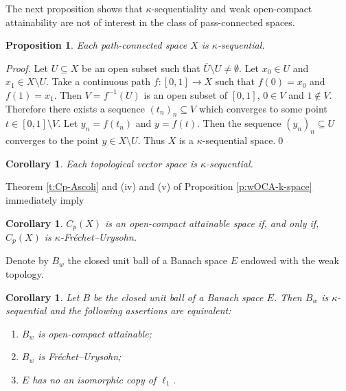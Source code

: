 \documentclass[preprint,11pt]{elsarticle}
\newtheorem{corollary}[theorem]{Corollary}
\newtheorem{proposition}[theorem]{Proposition}
\numberwithin{equation}{section}
\numberwithin{theorem}{section}
\begin{document}
The next proposition shows that $\kappa$-sequentiality and weak open-compact attainability are not of interest in the class of pass-connected spaces.

\begin{proposition}\label{p:pass-connected-k-sequential}
Each path-connected space $X$ is $\kappa$-sequential.
\end{proposition}
\begin{proof}
Let $U\subseteq X$ be an open subset such that $\overline{U}\setminus U\neq\emptyset$.
Let $x_0\in U$ and $x_1\in X\setminus U$. Take a continuous path  $f: [0,1]\to X$ such that $f(0)=x_0$ and $f(1)=x_1$. Then $V=f^{-1}(U)$ is an open subset of $[0,1]$, $0\in V$ and $1\notin V$. Therefore there exists a sequence $(t_n)_n\subseteq V$ which converges to some point $t\in [0,1]\setminus V$. Let $y_n=f(t_n)$ and $y=f(t)$. Then the sequence $(y_n)_n\subseteq U$ converges to the point $y\in X\setminus U$. Thus $X$ is a $\kappa$-sequential space.\qed
\end{proof}

\begin{corollary} \label{c:lcs-k-sequential}
Each topological vector space is $\kappa$-sequential.
\end{corollary}



Theorem \ref{t:Cp-Ascoli} and (iv) and (v) of Proposition \ref{p:wOCA-k-space} immediately imply
\begin{corollary} \label{c:Cp-oca}
$C_p(X)$ is an open-compact attainable space if, and only if, $C_p(X)$ is $\kappa$-Fr\'{e}chet--Urysohn.
\end{corollary}


Denote by $B_w$ the closed unit ball of a Banach space $E$ endowed with the weak topology.
\begin{corollary} \label{c:unit-ball-oca}
Let $B$ be the closed unit ball of a Banach space $E$. Then $B_w$ is $\kappa$-sequential and the following assertions are equivalent:
\begin{enumerate}
\item[{\rm(i)}] $B_w$ is open-compact attainable;
\item[{\rm(ii)}] $B_w$ is  Fr\'{e}chet--Urysohn;
\item[{\rm(iii)}] $E$ has no an isomorphic copy of $\ell_1$.
\end{enumerate}
\end{corollary}
\end{document}
